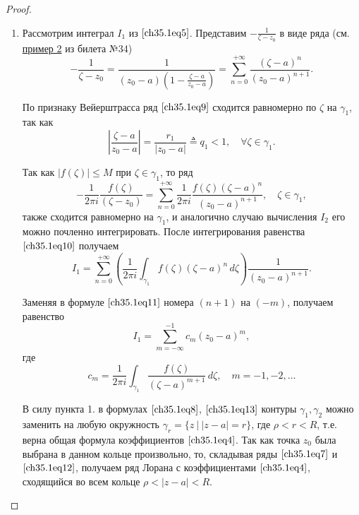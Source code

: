 \begin{leftbar}
\begin{proof}
\begin{enumerate}
\item

Рассмотрим интеграл $I_1$ из $\eqref{ch35.1eq5}$. Представим $-\frac{1}{\zeta - z_0}$ в виде ряда (см. \hyperref[exmpl2]{пример 2} из билета №34)
\begin{equation} \label{ch35.1eq9}
-\frac{1}{\zeta - z_0} = \frac{1}{(z_0 - a) \left( 1 - \frac{\zeta - a}{z_0 - a}\right)} = \sum_{n = 0}^{+\infty} \frac{(\zeta - a)^n}{(z_0 - a)^{n + 1}}.
\end{equation}

По признаку Вейерштрасса ряд $\eqref{ch35.1eq9}$ сходится равномерно по $\zeta$ на $\gamma_1$, так как
$$
\left| \frac{\zeta - a}{z_0 - a}\right| = \frac{r_1}{|z_0 - a|} \triangleq q_1 < 1, \quad \forall \zeta \in \gamma_1.
$$

Так как $|f(\zeta)| \le M$ при $\zeta \in \gamma_1$, то ряд
\begin{equation} \label{ch35.1eq10}
-\frac{1}{2\pi i} \frac{f(\zeta)}{(\zeta - z_0)} = \sum\limits_{n = 0}^{+\infty} \frac{1}{2\pi i} \frac{f(\zeta)(\zeta - a)^n}{(z_0 - a)^{n + 1}}, \quad \zeta \in \gamma_1,
\end{equation}
также сходится равномерно на $\gamma_1$, и аналогично случаю вычисления $I_2$ его можно почленно интегрировать. После интегрирования равенства $\eqref{ch35.1eq10}$ получаем
\begin{equation} \label{ch35.1eq11}
I_1 = \sum\limits_{n = 0}^{+\infty} \left( \frac{1}{2\pi i} \int_{\gamma_1} f(\zeta)(\zeta - a)^n \,d\zeta\right) \frac{1}{(z_0 - a)^{n + 1}}.
\end{equation}

Заменяя в формуле $\eqref{ch35.1eq11}$ номера $(n + 1)$ на $(-m)$, получаем равенство
\begin{equation} \label{ch35.1eq12}
I_1 = \sum\limits_{m = -\infty}^{-1} c_m (z_0 - a)^m,
\end{equation}
где
\begin{equation} \label{ch35.1eq13}
c_m = \frac{1}{2\pi i} \int_{\gamma_1} \frac{f(\zeta)}{(\zeta - a)^{m + 1}} \,d\zeta, \quad m = -1,-2,\ldots
\end{equation}

В силу пункта 1. в формулах $\eqref{ch35.1eq8}$, $\eqref{ch35.1eq13}$ контуры $\gamma_1, \gamma_2$ можно заменить на любую окружность $\gamma_r = \{ z \: \big| \: |z - a| = r\}$, где $\rho < r < R$, т.е.
верна общая формула коэффициентов $\eqref{ch35.1eq4}$. Так как точка $z_0$ была выбрана в данном кольце произвольно, то, складывая ряды $\eqref{ch35.1eq7}$ и $\eqref{ch35.1eq12}$, получаем ряд Лорана с коэффициентами $\eqref{ch35.1eq4}$, сходящийся во всем кольце $\rho < |z - a| < R$.	

\end{enumerate}

\end{proof}
\end{leftbar}

